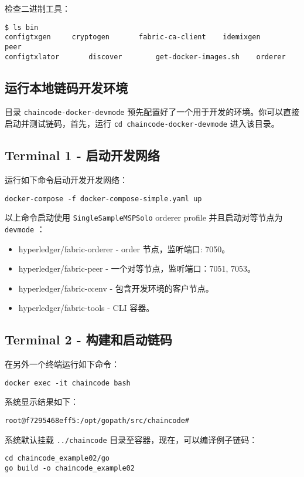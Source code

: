 \documentclass[11pt]{article}
\begin{document}
检查二进制工具：
\begin{verbatim}
$ ls bin
configtxgen     cryptogen       fabric-ca-client    idemixgen       peer
configtxlator       discover        get-docker-images.sh    orderer
\end{verbatim}

\subsection{运行本地链码开发环境}
\label{sec-3-3}
目录 \texttt{chaincode-docker-devmode} 预先配置好了一个用于开发的环境。你可以直接启动并测试链码，首先，运行 \texttt{cd chaincode-docker-devmode} 进入该目录。

\subsection{Terminal 1 - 启动开发网络}
\label{sec-3-4}
运行如下命令启动开发开发网络：
\begin{verbatim}
docker-compose -f docker-compose-simple.yaml up
\end{verbatim}

以上命令启动使用 \texttt{SingleSampleMSPSolo} orderer profile 并且启动对等节点为 \texttt{devmode} ：
\begin{itemize}
\item hyperledger/fabric-orderer - order 节点，监听端口: 7050。
\item hyperledger/fabric-peer - 一个对等节点，监听端口：7051, 7053。
\item hyperledger/fabric-ccenv - 包含开发环境的客户节点。
\item hyperledger/fabric-tools - CLI 容器。
\end{itemize}

\subsection{Terminal 2 - 构建和启动链码}
\label{sec-3-5}
在另外一个终端运行如下命令：
\begin{verbatim}
docker exec -it chaincode bash
\end{verbatim}

系统显示结果如下：
\begin{verbatim}
root@f7295468eff5:/opt/gopath/src/chaincode#
\end{verbatim}

系统默认挂载 \texttt{../chaincode} 目录至容器，现在，可以编译例子链码：
\begin{verbatim}
cd chaincode_example02/go
go build -o chaincode_example02
\end{verbatim}
\end{document}
